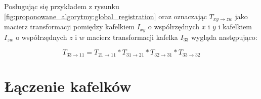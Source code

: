 Posługując się przykładem z rysunku \ref{fig:proponowane_algorytmy:global_registration} oraz oznaczając $T_{xy\rightarrow zw}$ jako macierz transformacji pomiędzy kafelkiem $I_{xy}$ o współrzędnych $x$ i $y$ i kafelkiem $I_{zw}$ o współrzędnych $z$ i $w$ macierz transformacji kafelka $I_{33}$ wygląda następująco:

\begin{equation}
T_{33\rightarrow 11} = T_{21\rightarrow 11} * T_{31\rightarrow 21} * T_{32\rightarrow 31} * T_{33\rightarrow 32}
\end{equation}

\section{Łączenie kafelków}
\label{sec:proponowane_algorytmy:laczenie_kafelkow}
